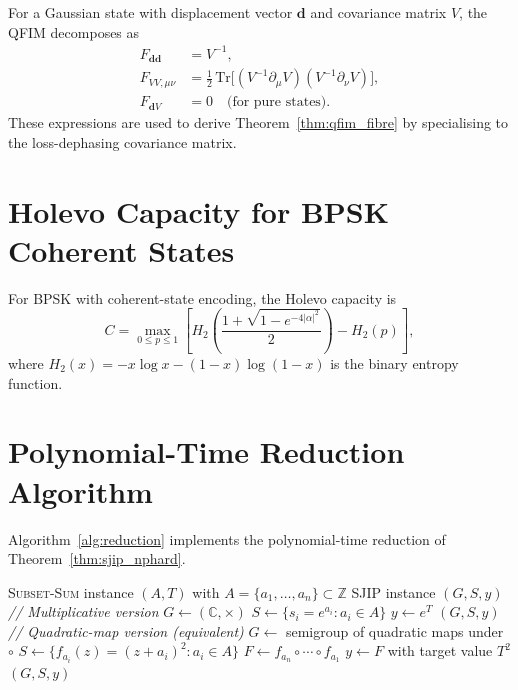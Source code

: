 \documentclass[journal,twocolumn]{IEEEtran}
\theoremstyle{definition}
\theoremstyle{plain}
\newcommand{\C}{\mathbb{C}}
\newcommand{\Z}{\mathbb{Z}}
\newcommand{\Tr}{\mathrm{Tr}}
\begin{document}
For a Gaussian state with displacement vector $\mathbf{d}$ and
covariance matrix $V$, the QFIM decomposes as
\begin{align}
  F_{\mathbf{d}\mathbf{d}} &= V^{-1}, \label{eq:Fdd}\\
  F_{VV,\mu\nu} &= \tfrac{1}{2}\,\Tr\!\bigl[(V^{-1}\partial_\mu V)
    (V^{-1}\partial_\nu V)\bigr], \label{eq:FVV}\\
  F_{\mathbf{d}V} &= 0 \quad \text{(for pure states)}. \label{eq:FdV}
\end{align}
These expressions are used to derive Theorem~\ref{thm:qfim_fibre} by
specialising to the loss-dephasing covariance matrix.

\section{Holevo Capacity for BPSK Coherent States}
\label{app:holevo_bpsk}

For BPSK with coherent-state encoding, the Holevo capacity is
\begin{equation}
  C = \max_{0 \le p \le 1}\!\left[
    H_2\!\left(\frac{1+\sqrt{1-e^{-4|\alpha|^2}}}{2}\right)
    - H_2(p)\right],
  \label{eq:C_BPSK_appendix}
\end{equation}
where $H_2(x) = -x\log x - (1-x)\log(1-x)$ is the binary entropy
function.

\section{Polynomial-Time Reduction Algorithm}
\label{app:reduction}

Algorithm~\ref{alg:reduction} implements the polynomial-time
reduction of Theorem~\ref{thm:sjip_nphard}.

\begin{algorithm}[H]
\caption{Polynomial-Time Reduction: \textsc{Subset-Sum} to SJIP}
\label{alg:reduction}
\begin{algorithmic}[1]
\Require \textsc{Subset-Sum} instance $(A, T)$ with
         $A = \{a_1,\ldots,a_n\} \subset \Z$
\Ensure SJIP instance $(G, S, y)$
\State \textit{// Multiplicative version}
\State $G \leftarrow (\C, \times)$
\State $S \leftarrow \{s_i = e^{a_i} : a_i \in A\}$
\State $y \leftarrow e^T$
\Return $(G, S, y)$
\State \textit{// Quadratic-map version (equivalent)}
\State $G \leftarrow$ semigroup of quadratic maps under $\circ$
\State $S \leftarrow \{f_{a_i}(z) = (z+a_i)^2 : a_i \in A\}$
\State $F \leftarrow f_{a_n} \circ \cdots \circ f_{a_1}$
\State $y \leftarrow F$ with target value $T^2$
\Return $(G, S, y)$
\end{algorithmic}
\end{algorithm}
\end{document}
